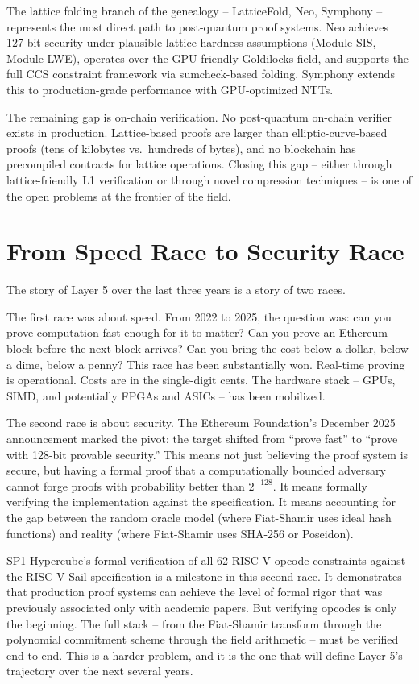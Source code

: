 \documentclass[
  11pt,
  openany]{report}
\begin{document}
The lattice folding branch of the genealogy -- LatticeFold, Neo, Symphony --
represents the most direct path to post-quantum proof systems. Neo achieves
127-bit security under plausible lattice hardness assumptions (Module-SIS,
Module-LWE), operates over the GPU-friendly Goldilocks field, and supports the
full CCS constraint framework via sumcheck-based folding. Symphony extends this
to production-grade performance with GPU-optimized NTTs.

The remaining gap is on-chain verification. No post-quantum on-chain verifier
exists in production. Lattice-based proofs are larger than elliptic-curve-based
proofs (tens of kilobytes vs.~hundreds of bytes), and no blockchain has
precompiled contracts for lattice operations. Closing this gap -- either through
lattice-friendly L1 verification or through novel compression techniques -- is
one of the open problems at the frontier of the field.

\section{From Speed Race to Security
Race}\label{from-speed-race-to-security-race}

The story of Layer 5 over the last three years is a story of two races.

The first race was about speed. From 2022 to 2025, the question was: can you
prove computation fast enough for it to matter? Can you prove an Ethereum block
before the next block arrives? Can you bring the cost below a dollar, below a
dime, below a penny? This race has been substantially won. Real-time proving is
operational. Costs are in the single-digit cents. The hardware stack -- GPUs,
SIMD, and potentially FPGAs and ASICs -- has been mobilized.

The second race is about security. The Ethereum Foundation's December 2025
announcement marked the pivot: the target shifted from ``prove fast'' to ``prove
with 128-bit provable security.'' This means not just believing the proof system
is secure, but having a formal proof that a computationally bounded adversary
cannot forge proofs with probability better than \(2^{-128}\). It means formally
verifying the implementation against the specification. It means accounting for
the gap between the random oracle model (where Fiat-Shamir uses ideal hash
functions) and reality (where Fiat-Shamir uses SHA-256 or Poseidon).

SP1 Hypercube's formal verification of all 62 RISC-V opcode constraints against
the RISC-V Sail specification is a milestone in this second race. It
demonstrates that production proof systems can achieve the level of formal rigor
that was previously associated only with academic papers. But verifying opcodes
is only the beginning. The full stack -- from the Fiat-Shamir transform through
the polynomial commitment scheme through the field arithmetic -- must be
verified end-to-end. This is a harder problem, and it is the one that will
define Layer 5's trajectory over the next several years.
\end{document}
